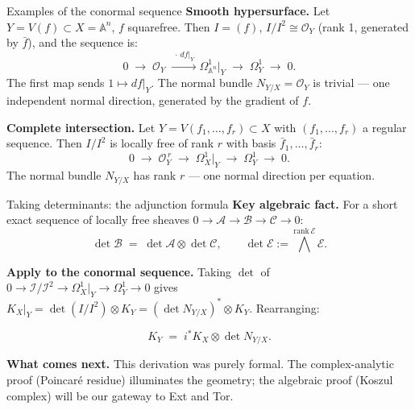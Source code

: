 \documentclass[aspectratio=169,12pt]{beamer}
\newenvironment{mathbox}{%
  \begin{tcolorbox}[mathbox]}{%
  \end{tcolorbox}}
\begin{document}
\begin{frame}{Examples of the conormal sequence}
  \textbf{Smooth hypersurface.}\enspace
  Let $Y = V(f) \subset X = \mathbb{A}^n$, $f$ squarefree.
  Then $I = (f)$,\; $I/I^2 \cong \mathcal{O}_Y$ (rank 1, generated by $\bar{f}$),
  and the sequence is:
  \[
    0 \;\longrightarrow\; \mathcal{O}_Y \;\xrightarrow{\;\cdot\, df|_Y\;}
      \Omega^1_{\mathbb{A}^n}\big|_Y \;\longrightarrow\; \Omega^1_Y
    \;\longrightarrow\; 0.
  \]
  The first map sends $1 \mapsto df|_Y$.
  The normal bundle $N_{Y/X} = \mathcal{O}_Y$ is trivial —
  one independent normal direction, generated by the gradient of $f$.

  \bigskip

  \textbf{Complete intersection.}\enspace
  Let $Y = V(f_1,\ldots,f_r) \subset X$ with $(f_1,\ldots,f_r)$ a regular sequence.
  Then $I/I^2$ is locally free of rank $r$ with basis $\bar{f}_1,\ldots,\bar{f}_r$:
  \[
    0 \;\longrightarrow\; \mathcal{O}_Y^{\,r}
      \;\longrightarrow\; \Omega^1_X\big|_Y
      \;\longrightarrow\; \Omega^1_Y
      \;\longrightarrow\; 0.
  \]
  The normal bundle $N_{Y/X}$ has rank $r$ — one normal direction per equation.
\end{frame}

\begin{frame}{Taking determinants: the adjunction formula}
  \textbf{Key algebraic fact.}\enspace
  For a short exact sequence of locally free sheaves
  $0 \to \mathcal{A} \to \mathcal{B} \to \mathcal{C} \to 0$:
  \[
    \det \mathcal{B} \;=\; \det \mathcal{A} \otimes \det \mathcal{C},
    \qquad \det \mathcal{E} := \textstyle\bigwedge^{\mathrm{rank}\,\mathcal{E}} \mathcal{E}.
  \]

  \textbf{Apply to the conormal sequence.}\enspace
  Taking $\det$ of
  $0 \to \mathcal{I}/\mathcal{I}^2 \to \Omega^1_X|_Y \to \Omega^1_Y \to 0$
  gives $K_X|_Y = \det(I/I^2) \otimes K_Y = (\det N_{Y/X})^* \otimes K_Y$.
  Rearranging:
  \begin{mathbox}
  \[
    K_Y \;=\; i^*K_X \otimes \det N_{Y/X}.
  \]
  \end{mathbox}

  \textbf{What comes next.}\enspace
  This derivation was purely formal.
  The complex-analytic proof (Poincaré residue) illuminates the geometry;
  the algebraic proof (Koszul complex) will be our gateway to Ext and Tor.
\end{frame}
\end{document}
